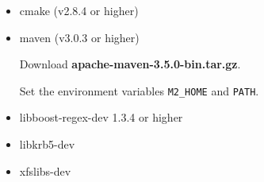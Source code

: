 \documentclass[letterpaper,12pt]{article}
\begin{document}
\begin{itemize}

\item cmake (v2.8.4 or higher)

\begin{center}
\noindent{}
\end{center}

\item maven (v3.0.3 or higher)

Download {\bf apache-maven-3.5.0-bin.tar.gz}.

\begin{center}
\noindent{}
\end{center}

Set the environment variables {\tt M2\_HOME} and {\tt PATH}.

\begin{center}
\noindent{}
\end{center}


\item libboost-regex-dev 1.3.4 or higher

\begin{center}
\noindent{}
\end{center}

\item libkrb5-dev

\begin{center}
\noindent{}
\end{center}

\item xfslibs-dev

\begin{center}
\noindent{}
\end{center}


\end{itemize}
\end{document}

